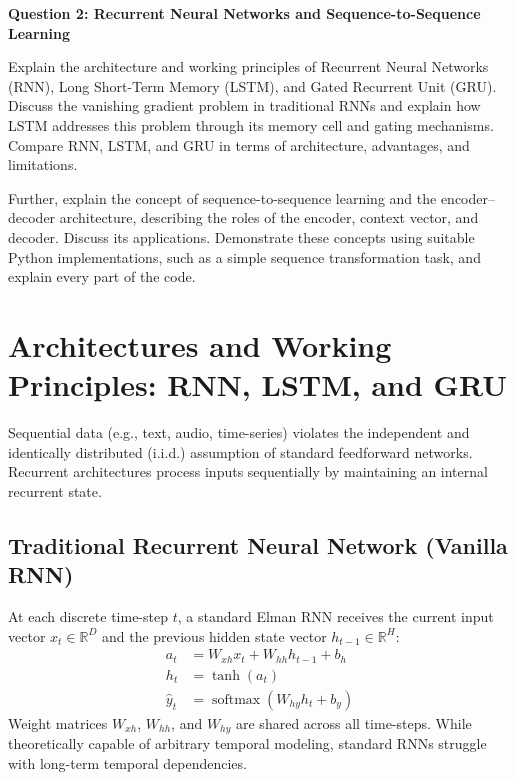 \documentclass[12pt,a4paper]{article}
\begin{document}
{\noindent\LARGE\textbf{Question 2: Recurrent Neural Networks and Sequence-to-Sequence Learning}}\par
\vspace{0.8em}
\noindent Explain the architecture and working principles of Recurrent Neural Networks (RNN), Long Short-Term Memory (LSTM), and Gated Recurrent Unit (GRU). Discuss the vanishing gradient problem in traditional RNNs and explain how LSTM addresses this problem through its memory cell and gating mechanisms. Compare RNN, LSTM, and GRU in terms of architecture, advantages, and limitations.\par\vspace{0.5em}
\noindent Further, explain the concept of sequence-to-sequence learning and the encoder--decoder architecture, describing the roles of the encoder, context vector, and decoder. Discuss its applications. Demonstrate these concepts using suitable Python implementations, such as a simple sequence transformation task, and explain every part of the code.
\par\vspace{1.2em}

\section{Architectures and Working Principles: RNN, LSTM, and GRU}
Sequential data (e.g., text, audio, time-series) violates the independent and identically distributed (i.i.d.) assumption of standard feedforward networks. Recurrent architectures process inputs sequentially by maintaining an internal recurrent state.

\subsection{Traditional Recurrent Neural Network (Vanilla RNN)}
At each discrete time-step $t$, a standard Elman RNN receives the current input vector $x_t \in \mathbb{R}^D$ and the previous hidden state vector $h_{t-1} \in \mathbb{R}^H$:
\begin{align}
a_t &= W_{xh} x_t + W_{hh} h_{t-1} + b_h \\
h_t &= \tanh(a_t) \\
\hat{y}_t &= \operatorname{softmax}(W_{hy} h_t + b_y)
\end{align}
Weight matrices $W_{xh}$, $W_{hh}$, and $W_{hy}$ are shared across all time-steps. While theoretically capable of arbitrary temporal modeling, standard RNNs struggle with long-term temporal dependencies.
\end{document}
